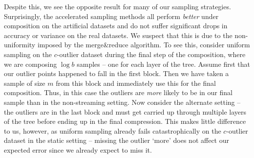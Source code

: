 Despite this, we see the opposite result for many of our sampling strategies. Surprisingly, the accelerated sampling methods all perform \emph{better} under
composition on the artificial datasets and do not suffer significant drops in accuracy or variance on the real datasets. We suspect that this is due to the
non-uniformity imposed by the merge\&reduce algorithm. To see this, consider uniform sampling on the $c$-outlier dataset during the final step of the
composition, where we are composing $\log b$ samples -- one for each layer of the tree. Assume first that our outlier points happened to fall in the first
block. Then we have taken a sample of size $m$ from this block and immediately use this for the final composition. Thus, in this case the outliers are
\emph{more} likely to be in our final sample than in the non-streaming setting. Now consider the alternate setting -- the outliers are in the last block and
must get carried up through multiple layers of the tree before ending up in the final compression. This makes little difference to us, however, as uniform
sampling already fails catastrophically on the $c$-outlier dataset in the static setting -- missing the outlier `more' does not affect our expected error since
we already expect to miss it.


